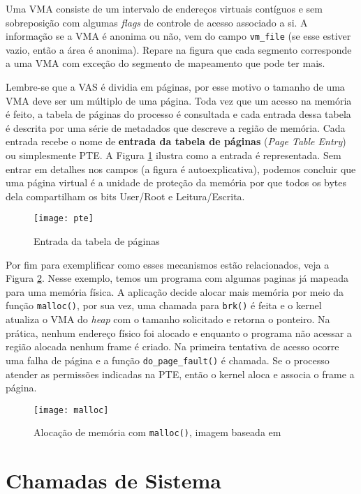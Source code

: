 Uma VMA consiste de um intervalo de endereços virtuais contíguos e sem
sobreposição com algumas \textit{flags} de controle de acesso associado a si. A
informação se a VMA é anonima ou não, vem do campo \texttt{vm\_file} (se esse
estiver vazio, então a área é anonima). Repare na figura que cada segmento
corresponde a uma VMA com exceção do segmento de mapeamento que pode ter mais.

Lembre-se que a VAS é dividia em páginas, por esse motivo o tamanho de uma VMA
deve ser um múltiplo de uma página. Toda vez que um acesso na memória é feito,
a tabela de páginas do processo é consultada e cada entrada dessa tabela é
descrita por uma série de metadados que descreve a região de memória. Cada
entrada recebe o nome de \textbf{entrada da tabela de páginas} (\textit{Page
Table Entry}) ou simplesmente PTE. A Figura \ref{fig:pte} ilustra como a
entrada é representada. Sem entrar em detalhes nos campos (a figura é
autoexplicativa), podemos concluir que uma página virtual é a unidade de
proteção da memória por que todos os bytes dela compartilham os bits User/Root
e Leitura/Escrita.

\begin{figure}[!h]
  \centering
  \texttt{[image: pte]}
  \caption{Entrada da tabela de páginas}
  \label{fig:pte}
\end{figure}

Por fim para exemplificar como esses mecanismos estão relacionados, veja a
Figura \ref{fig:malloc_linux}. Nesse exemplo, temos um programa com algumas
paginas já mapeada para uma memória física. A aplicação decide alocar mais
memória por meio da função \texttt{malloc()}, por sua vez, uma chamada para
\texttt{brk()} é feita e o kernel atualiza o VMA do \textit{heap} com o tamanho
solicitado e retorna o ponteiro. Na prática, nenhum endereço físico foi alocado
e enquanto o programa não acessar a região alocada nenhum frame é criado. Na
primeira tentativa de acesso ocorre uma falha de página e a função
\texttt{do\_page\_fault()} é chamada. Se o processo atender as permissões
indicadas na PTE, então o kernel aloca e associa o frame a página.

\begin{figure}[!h]
  \centering
  \texttt{[image: malloc]}
  \caption{Alocação de memória com \texttt{malloc()}, imagem baseada em \citep{anatomy_program_mem}}
  \label{fig:malloc_linux}
\end{figure}

\section{Chamadas de Sistema}

